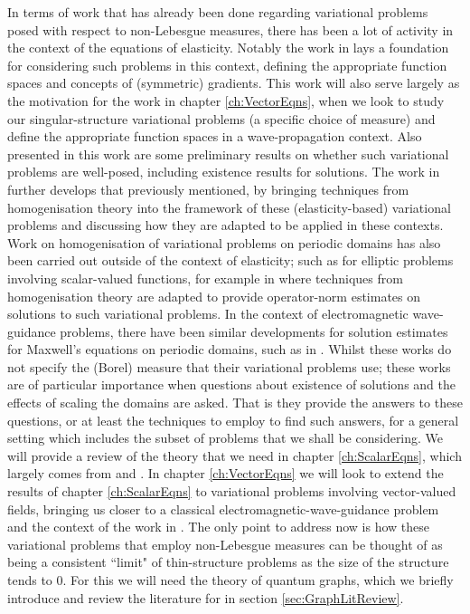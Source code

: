 In terms of work that has already been done regarding variational problems posed with respect to non-Lebesgue measures, there has been a lot of activity in the context of the equations of elasticity.
Notably the work in \cite{zhikov2000extension} lays a foundation for considering such problems in this context, defining the appropriate function spaces and concepts of (symmetric) gradients.
This work will also serve largely as the motivation for the work in chapter \ref{ch:VectorEqns}, when we look to study our singular-structure variational problems (a specific choice of measure) and define the appropriate function spaces in a wave-propagation context.
Also presented in this work are some preliminary results on whether such variational problems are well-posed, including existence results for solutions.
The work in \cite{zhikov2002homogenization} further develops that previously mentioned, by bringing techniques from homogenisation theory into the framework of these (elasticity-based) variational problems and discussing how they are adapted to be applied in these contexts. 
Work on homogenisation of variational problems on periodic domains has also been carried out outside of the context of elasticity; such as for elliptic problems involving scalar-valued functions, for example in \cite{cherednichenko2018elliptic} where techniques from homogenisation theory are adapted to provide operator-norm estimates on solutions to such variational problems. 
In the context of electromagnetic wave-guidance problems, there have been similar developments for solution estimates for Maxwell's equations on periodic domains, such as in \cite{cherednichenko2018maxwell}.
Whilst these works do not specify the (Borel) measure that their variational problems use; these works are of particular importance when questions about existence of solutions and the effects of scaling the domains are asked.
That is they provide the answers to these questions, or at least the techniques to employ to find such answers, for a general setting which includes the subset of problems that we shall be considering.
We will provide a review of the theory that we need in chapter \ref{ch:ScalarEqns}, which largely comes from \cite{zhikov2000extension} and \cite{cherednichenko2018elliptic}.
In chapter \ref{ch:VectorEqns} we will look to extend the results of chapter \ref{ch:ScalarEqns} to variational problems involving vector-valued fields, bringing us closer to a classical electromagnetic-wave-guidance problem and the context of the work in \cite{cherednichenko2018maxwell}.
The only point to address now is how these variational problems that employ non-Lebesgue measures can be thought of as being a consistent ``limit" of thin-structure problems as the size of the structure tends to 0.
For this we will need the theory of quantum graphs, which we briefly introduce and review the literature for in section \ref{sec:GraphLitReview}.

